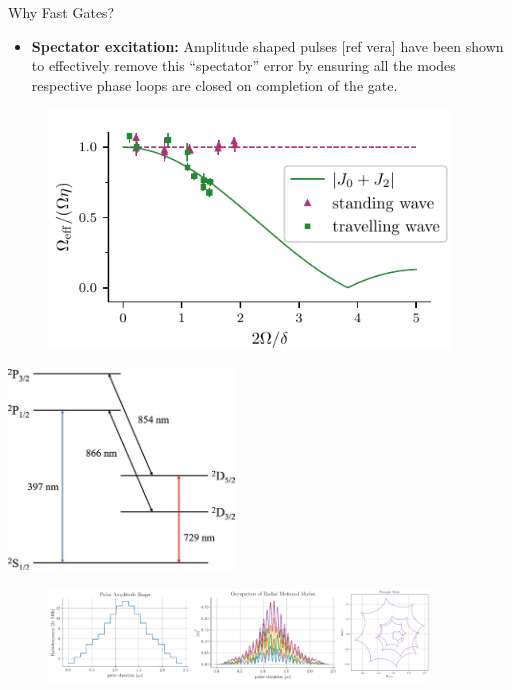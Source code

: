 \documentclass[final]{beamer}
\begin{document}
\begin{frame}{}
\begin{center}
\begin{columns}[t]
\begin{column}{0.49\textwidth}
\begin{alertblock}{Why Fast Gates?}
\begin{minipage}{0.6\textwidth}
\begin{itemize}
      \item \textbf{Spectator excitation:} Amplitude shaped pulses
        [ref vera] have been shown to effectively remove this
        ``spectator'' error by ensuring all the modes respective phase
        loops are closed on completion of the gate.\\
      \end{itemize}
      \end{minipage}
      \begin{minipage}{0.36\textwidth}
      \begin{figure}
        \includegraphics[width=0.95\textwidth]{./figs/J0J2.pdf}
      \end{figure}
      \end{minipage}
        \includegraphics[width=0.45\textwidth]{./figs/ca_struct_tmp.jpeg}

      \begin{figure}
        \includegraphics[width=0.9\textwidth]{./figs/loop_closing.png}
      \end{figure}
    \end{alertblock}


\end{column}
\end{columns}
\end{center}
\end{frame}
\end{document}
